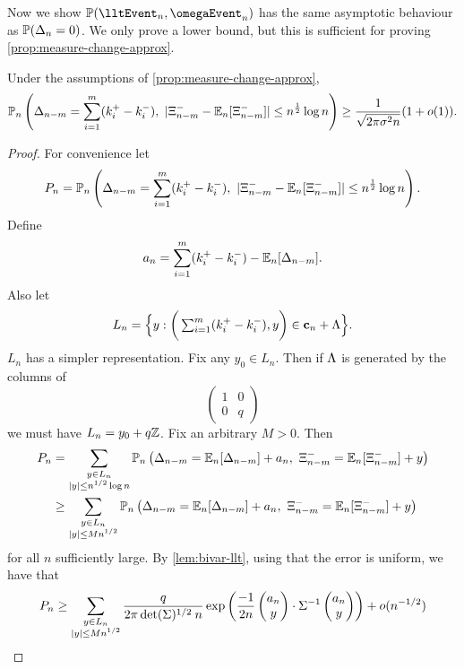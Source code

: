 Now we show $\P(\lltEvent_n, \omegaEvent_n)$ has the same asymptotic behaviour as $\P(\Delta_n = 0)$. We only prove a lower bound, but this is sufficient for proving \cref{prop:measure-change-approx}.
\begin{lemma}
    \label{lem:mod-dev-local}
    Under the assumptions of \cref{prop:measure-change-approx},
    \begin{equation*}
        \mathbb P_n \left(
            \Delta_{n-m} = \sum_{i=1}^m (k_i^+ - k_i^-), \ 
            \abs{\Xi^-_{n-m} - \E_n[\Xi^-_{n-m}]} \leq n^{\frac{1}{2}} \log n
        \right)
        \geq \frac{1}{\sqrt{2 \pi \sigma^2 n}} (1 + \littleo(1)).
    \end{equation*}
\end{lemma}
\begin{proof}
    For convenience let
    \begin{equation*}
        P_n = \mathbb P_n \left(
            \Delta_{n-m} = \sum_{i=1}^m (k_i^+ - k_i^-), \ 
            \abs{\Xi^-_{n-m} - \E_n[\Xi^-_{n-m}]} \leq n^{\frac{1}{2}} \log n
        \right).
    \end{equation*}
    Define
    \begin{equation*}
        a_n = \sum_{i=1}^m (k_i^+ - k_i^-) - \E_n[\Delta_{n-m}].
    \end{equation*}
    Also let
    \begin{equation*}
        L_n = \Big\{
            y : \bigg( \textstyle\sum_{i=1}^m (k_i^+ - k_i^-), y \bigg) \in \vc_n + \lattice
            \Big\}.
    \end{equation*}
    $L_n$ has a simpler representation. Fix any $y_0 \in L_n$. Then if $\lattice$ is generated by the columns of
    \begin{equation*}
        \begin{pmatrix}
            1 & 0 \\
            0 & q
        \end{pmatrix}
    \end{equation*}
    we must have $L_n = y_0 + q\Z$. Fix an arbitrary $M > 0$. Then
    \begin{align*}
        P_n &= \sum_{\substack{y \in L_n \\ \abs{y} \leq n^{1/2} \log n}} \mathbb P_n \left( \Delta_{n-m} = \E_n[\Delta_{n-m}] + a_n, \ \Xi^-_{n-m} = \E_n[\Xi^-_{n-m}] + y \right) \\
        &\geq \sum_{\substack{y \in L_n \\ \abs{y} \leq M n^{1/2}}} \mathbb P_n \left( \Delta_{n-m} = \E_n[\Delta_{n-m}] + a_n, \ \Xi^-_{n-m} = \E_n[\Xi^-_{n-m}] + y \right)
    \end{align*}
    for all $n$ sufficiently large. By \cref{lem:bivar-llt}, using that the error is uniform, we have that
    \begin{equation*}
        P_n \geq \sum_{\substack{y \in L_n \\ \abs{y} \leq M n^{1/2}}} 
         \frac{q}{2\pi \det(\Sigma)^{1/2} \: n} \exp\left( 
            \frac{-1}{2n} \vectwo{a_n}{y} \cdot \Sigma^{-1} \vectwo{a_n}{y}
         \right)
         + \littleo( n^{-1/2} )
    \end{equation*}


\end{proof}
